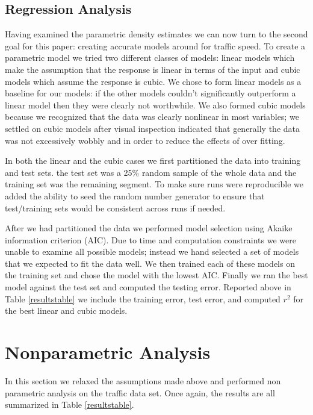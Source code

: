 \documentclass[12pt]{article}
\begin{document}
\subsection{Regression Analysis}
Having examined the parametric density estimates we can now turn to the second goal for this paper: creating accurate models around for traffic speed. To create a parametric model we tried two different classes of  models: linear models which make the assumption that the response is linear in terms of the input and cubic models which assume the response is cubic. We chose to form linear models as a baseline for our models: if the other models couldn't significantly outperform a linear model then they were clearly not worthwhile. We also formed cubic models because we recognized that the data was clearly nonlinear in most variables; we settled on cubic models after visual inspection indicated that generally the data was not excessively wobbly and in order to reduce the effects of over fitting.

In both the linear and the cubic cases we first partitioned the data into training and test sets. the test set was a 25\% random sample of the whole data and the training set was the remaining segment. To make sure runs were reproducible we added the ability to seed the random number generator to ensure that test/training sets would be consistent across runs if needed. 

After we had partitioned the data we performed model selection using Akaike information criterion (AIC). Due to time and computation constraints we were unable to examine all possible models; instead we hand selected a set of models that we expected to fit the data well. We then trained each of these models on the training set and chose the model with the lowest AIC. Finally we ran the best model against the test set and computed the testing error. Reported above in Table \ref{resultstable} we include the training error, test error, and computed $r^2$ for the best linear and cubic models. 
\section{Nonparametric Analysis}
In this section we relaxed the assumptions made above and performed non parametric analysis on the traffic data set. Once again, the results are all summarized in Table \ref{resultstable}.
\end{document}
